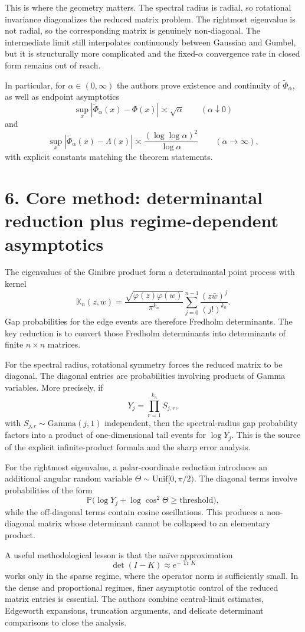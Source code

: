 \documentclass[11pt]{article}
\begin{document}
This is where the geometry matters. The spectral radius is radial, so rotational invariance diagonalizes the reduced matrix problem. The rightmost eigenvalue is not radial, so the corresponding matrix is genuinely non-diagonal. The intermediate limit still interpolates continuously between Gaussian and Gumbel, but it is structurally more complicated and the fixed-$\alpha$ convergence rate in closed form remains out of reach.

In particular, for $\alpha\in(0,\infty)$ the authors prove existence and continuity of $\widetilde\Phi_\alpha$, as well as endpoint asymptotics
\[
\sup_x |\widetilde\Phi_\alpha(x)-\Phi(x)|\asymp \sqrt\alpha \qquad (\alpha\downarrow 0)
\]
and
\[
\sup_x |\widetilde\Phi_\alpha(x)-\Lambda(x)|\asymp \frac{(\log\log\alpha)^2}{\log\alpha} \qquad (\alpha\to\infty),
\]
with explicit constants matching the theorem statements.

\section*{6. Core method: determinantal reduction plus regime-dependent asymptotics}
The eigenvalues of the Ginibre product form a determinantal point process with kernel
\[
\mathbb K_n(z,w)=\frac{\sqrt{\varphi(z)\varphi(w)}}{\pi^{k_n}}\sum_{j=0}^{n-1}\frac{(z\bar w)^j}{(j!)^{k_n}}.
\]
Gap probabilities for the edge events are therefore Fredholm determinants. The key reduction is to convert those Fredholm determinants into determinants of finite $n\times n$ matrices.

For the spectral radius, rotational symmetry forces the reduced matrix to be diagonal. The diagonal entries are probabilities involving products of Gamma variables. More precisely, if
\[
Y_j=\prod_{r=1}^{k_n} S_{j,r},
\]
with $S_{j,r}\sim \mathrm{Gamma}(j,1)$ independent, then the spectral-radius gap probability factors into a product of one-dimensional tail events for $\log Y_j$. This is the source of the explicit infinite-product formula and the sharp error analysis.

For the rightmost eigenvalue, a polar-coordinate reduction introduces an additional angular random variable $\Theta\sim \mathrm{Unif}[0,\pi/2)$. The diagonal terms involve probabilities of the form
\[
\mathbb P\bigl(\log Y_j+\log\cos^2\Theta \ge \text{threshold}\bigr),
\]
while the off-diagonal terms contain cosine oscillations. This produces a non-diagonal matrix whose determinant cannot be collapsed to an elementary product.

A useful methodological lesson is that the naïve approximation
\[
\det(I-K)\approx e^{-\operatorname{Tr} K}
\]
works only in the sparse regime, where the operator norm is sufficiently small. In the dense and proportional regimes, finer asymptotic control of the reduced matrix entries is essential. The authors combine central-limit estimates, Edgeworth expansions, truncation arguments, and delicate determinant comparisons to close the analysis.
\end{document}
